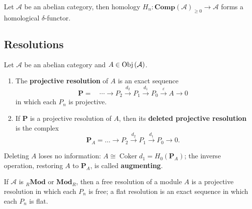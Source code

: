 \documentclass[12pt, oneside]{book}
\begin{document}
\begin{corollary}
    Let $\mathcal{A}$ be an abelian category, then homology $H_n:\mathbf{Comp}(\mathcal{A})_{\geq 0} \rightarrow \mathcal{A}$ forms a homological $\delta$-functor.
\end{corollary}


\subsection{Resolutions}
\begin{definition}
    Let $\mathcal{A}$ be an abelian category and $A\in \operatorname{\operatorname{Obj}}\left(\mathcal{A}\right)$.
    \begin{enumerate}
        \item
              The \textbf{projective resolution} of $A$ is an exact sequence
              \begin{equation*}
                  \mathbf{P}
                  =
                  \quad
                  \cdots\rightarrow P_2 \xrightarrow{d_2} P_1 \xrightarrow{d_1} P_0 \xrightarrow{\varepsilon} A \rightarrow 0
              \end{equation*}
              in which each $P_n$ is projective.
        \item
              If $\mathbf{P}$ is a projective resolution of $A$, then its \textbf{deleted projective resolution} is the complex
              \begin{equation*}
                  \mathbf{P}_A
                  =
                  \ldots\rightarrow P_2 \xrightarrow{d_2} P_1 \xrightarrow{d_1} P_0 \rightarrow 0 .
              \end{equation*}
    \end{enumerate}
    \begin{remark}
        Deleting $A$ loses no information: $A \cong \operatorname{Coker} d_1= H_0\left(\mathbf{P}_A\right)$; the inverse operation, restoring $A$ to $\mathbf{P}_A$, is called \textbf{augmenting}.

        If $\mathcal{A}$ is ${ }_R \mathbf{M o d}$ or $\mathbf{M o d}_R$, then a free resolution of a module $A$ is a projective resolution in which each $P_n$ is free; a flat resolution is an exact sequence in which each $P_n$ is flat.
    \end{remark}
\end{definition}
\end{document}
